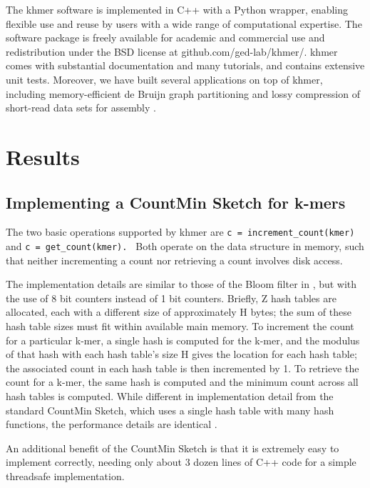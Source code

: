 \documentclass{article}
\begin{document}

The khmer software is implemented in C++ with a Python wrapper,
enabling flexible use and reuse by users with a wide range of
computational
expertise.  The software package is freely available for academic and
commercial use and redistribution under the BSD license at
github.com/ged-lab/khmer/.  khmer comes with substantial documentation
and many tutorials, and contains extensive unit tests.  Moreover, we
have built several applications on top of khmer, including
memory-efficient de Bruijn graph partitioning \cite{Pell2012} and
lossy compression of short-read data sets for assembly
\cite{Brown2012}.

\section{Results}

\subsection{Implementing a CountMin Sketch for k-mers}

The two basic operations supported by khmer are {\tt c =
  increment\_count(kmer) } and {\tt c = get\_count(kmer). }
Both operate on the data structure in memory, such that neither
incrementing a count nor retrieving a count involves disk
access.

The implementation details are similar to those of the Bloom filter in
\cite{Pell2012}, but with the use of 8 bit counters instead of 1 bit
counters.  Briefly, Z hash tables are allocated, each with a different
size of approximately H bytes; the sum of these hash table sizes must
fit within available main memory.  To increment the count for a
particular k-mer, a single hash is computed for the k-mer, and the
modulus of that hash with each hash table's size H gives the location
for each hash table; the associated count in each hash table is then
incremented by 1.  To retrieve the count for a k-mer, the same hash is
computed and the minimum count across all hash tables is computed.
While different in implementation detail from the standard CountMin Sketch,
which uses a single hash table with many hash
functions, the performance details are identical \cite{Pell2012}.

An additional benefit of the CountMin Sketch is that it is extremely
easy to implement correctly, needing only about 3 dozen lines of C++
code for a simple threadsafe implementation.
\end{document}
